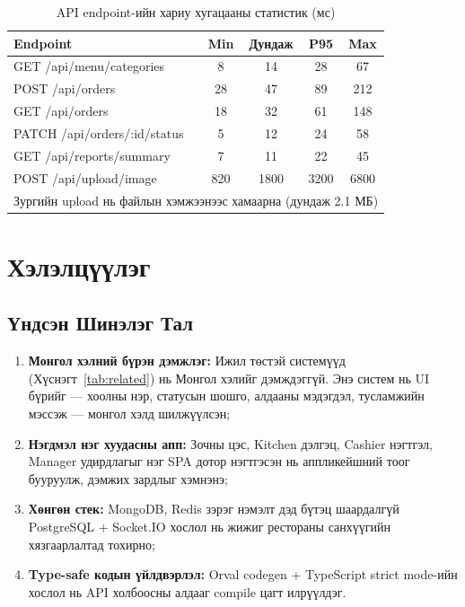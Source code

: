 \documentclass[12pt,a4paper]{article}
\begin{document}
\begin{table}[H]
\caption{API endpoint-ийн хариу хугацааны статистик (мс)}
\label{tab:apiperf}
\centering
\begin{tabularx}{\textwidth}{@{}p{4.5cm}cccc@{}}
\toprule
\textbf{Endpoint} & \textbf{Min} & \textbf{Дундаж} & \textbf{P95} & \textbf{Max} \\
\midrule
GET /api/menu/categories & 8   & 14  & 28  & 67  \\
POST /api/orders          & 28  & 47  & 89  & 212 \\
GET /api/orders           & 18  & 32  & 61  & 148 \\
PATCH /api/orders/:id/status & 5 & 12 & 24  & 58  \\
GET /api/reports/summary  & 7   & 11  & 22  & 45  \\
POST /api/upload/image    & 820 & 1800 & 3200 & 6800 \\
\bottomrule
\multicolumn{5}{l}{\small * Зургийн upload нь файлын хэмжээнээс хамаарна (дундаж 2.1 МБ)} \\
\end{tabularx}
\end{table}

\section{Хэлэлцүүлэг}
\label{sec:discuss}

\subsection{Үндсэн Шинэлэг Тал}

\begin{enumerate}[leftmargin=1.5cm]
  \item \textbf{Монгол хэлний бүрэн дэмжлэг:} Ижил төстэй
        системүүд (Хүснэгт~\ref{tab:related}) нь Монгол хэлийг
        дэмждэггүй. Энэ систем нь UI бүрийг --- хоолны нэр,
        статусын шошго, алдааны мэдэгдэл, тусламжийн мэссэж ---
        монгол хэлд шилжүүлсэн;

  \item \textbf{Нэгдмэл нэг хуудасны апп:} Зочны цэс, Kitchen
        дэлгэц, Cashier нэгтгэл, Manager удирдлагыг нэг SPA дотор
        нэгтгэсэн нь аппликейшний тоог бууруулж, дэмжих зардлыг
        хэмнэнэ;

  \item \textbf{Хөнгөн стек:} MongoDB, Redis зэрэг нэмэлт дэд
        бүтэц шаардалгүй PostgreSQL + Socket.IO хослол нь жижиг
        рестораны санхүүгийн хязгаарлалтад тохирно;

  \item \textbf{Type-safe кодын үйлдвэрлэл:} Orval codegen +
        TypeScript strict mode-ийн хослол нь API холбоосны
        алдааг compile цагт илрүүлдэг.
\end{enumerate}
\end{document}
